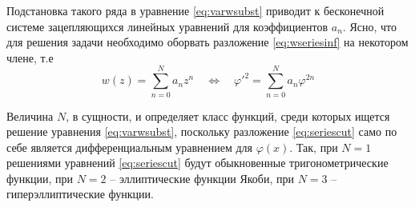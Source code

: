 Подстановка такого ряда в уравнение \eqref{eq:varwsubst} приводит к бесконечной системе зацепляющихся линейных уравнений для коэффициентов $a_n$.
Ясно, что для решения задачи необходимо оборвать разложение \eqref{eq:wseriesinf} на некотором члене, т.е 
\begin{equation}
w(z) = \sum_{n=0}^N a_n z^n \quad \Leftrightarrow \quad 
\varphi'^2 = \sum_{n=0}^N a_n \varphi^{2n}
\label{eq:seriescut}
\end{equation}

Величина $N$, в сущности, и определяет класс функций, среди которых ищется решение уравнения \eqref{eq:varwsubst}, поскольку разложение \eqref{eq:seriescut} само по себе является дифференциальным уравнением для $\varphi(x)$.
Так, при $N=1$ решениями уравнений \eqref{eq:seriescut} будут обыкновенные тригонометрические функции, при $N=2$ -- эллиптические функции Якоби, при $N=3$ -- гиперэллиптические функции.
